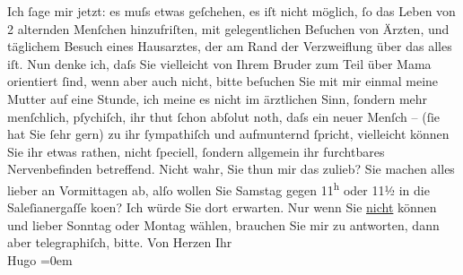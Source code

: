 \begin{ledgroupsized}[t]{13cm}
           \pstart
           Ich ſage mir jetzt: es muſs {\pb}etwas
               geſchehen, es iſt nicht möglich, ſo das Leben von 2 alternden Menſchen hinzufriſten,
               mit gelegentlichen Beſuchen von Ärzten, und täglichem Besuch eines Hausarztes, der am Rand der
               Verzweiflung über das alles iſt.\pend
           \pstart
           Nun denke ich, daſs Sie vielleicht von Ihrem Bruder zum Teil über Mama orientiert ſind, wenn aber auch nicht, bitte {\pb}beſuchen Sie mit mir einmal meine
                  Mutter auf eine Stunde, ich
               meine es nicht im ärztlichen Sinn, ſondern mehr menſchlich, pſychiſch, ihr thut ſchon
               abſolut noth, daſs ein neuer Menſch – (ſie hat Sie ſehr gern) zu ihr ſympathiſch und
               aufmunternd ſpricht, vielleicht können Sie ihr etwas rathen, nicht ſpeciell, ſondern
               allgemein ihr furchtbares Nervenbefinden betreffend.\pend
           \pstart
           Nicht wahr, Sie thun mir {\pb}das
               zulieb?\pend
           \pstart
           Sie machen alles lieber an Vormittagen ab, alſo wollen Sie Samstag gegen
                     11\textsuperscript{h} oder 11½ in die Saleſianergaſſe
                  ko{\geminationm}en?\pend
           \pstart
           Ich würde Sie dort erwarten. Nur wenn Sie \uline{nicht}
               können und lieber Sonntag oder Montag wählen, brauchen Sie
               mir zu antworten, dann {\pb}aber
               telegraphiſch, bitte.\pend
           \pstart
           Von Herzen Ihr{\\[\baselineskip]}\spacefill\mbox{Hugo}\pend
           \leftskip=0em{}          \endnumbering{}\end{ledgroupsized}  \newcommand{\dateiname}{L01380}\newcommand{\titel}{Hugo von Hofmannsthal an Arthur Schnitzler, [9. 3. 1904]}\newcommand{\editorInnen}{Martin Anton Müller und Gerd-Hermann Susen}
      